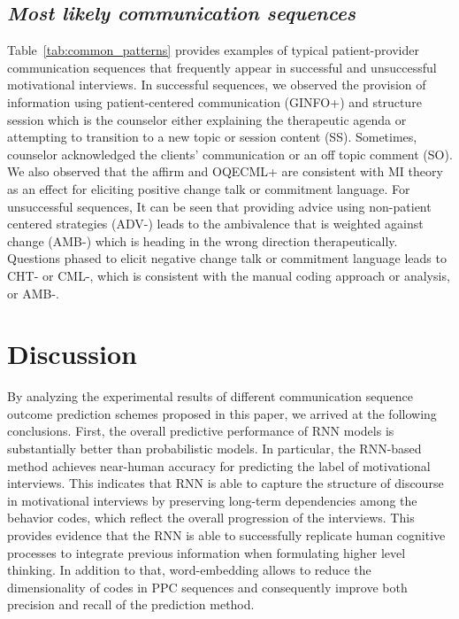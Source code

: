 \documentclass{amia_summit_2018}
\begin{document}
\subsection*{\textit{Most likely communication sequences}}
Table~\ref{tab:common_patterns} provides examples of typical patient-provider communication sequences that frequently appear in successful and unsuccessful motivational interviews. In successful sequences, we observed the provision of information using patient-centered communication (GINFO+) and structure session which is the counselor either explaining the therapeutic agenda or attempting to transition to a new topic or session content (SS). Sometimes, counselor acknowledged the clients' communication or an off topic comment (SO). We also observed that the affirm and OQECML+ are consistent with MI theory as an effect for eliciting positive change talk or commitment language. For unsuccessful sequences, It can be seen that providing advice using non-patient centered strategies (ADV-) leads to the ambivalence that is weighted against change (AMB-) which is heading in the wrong direction therapeutically. Questions phased to elicit negative change talk or commitment language leads to CHT- or CML-, which is consistent with the manual coding approach or analysis, or AMB-.

\section*{Discussion}
By analyzing the experimental results of different communication sequence outcome prediction schemes proposed in this paper, we arrived at the following conclusions. First, the overall predictive performance of RNN models is substantially better than probabilistic models. In particular, the RNN-based method achieves near-human accuracy for predicting the label of motivational interviews. This indicates that RNN is able to capture the structure of discourse in motivational interviews by preserving long-term dependencies among the behavior codes, which reflect the overall progression of the interviews. This provides evidence that the RNN is able to successfully replicate human cognitive processes to integrate previous information when formulating higher level thinking. In addition to that, word-embedding allows to reduce the dimensionality of codes in PPC sequences and consequently improve both precision and recall of the prediction method. 
\end{document}
